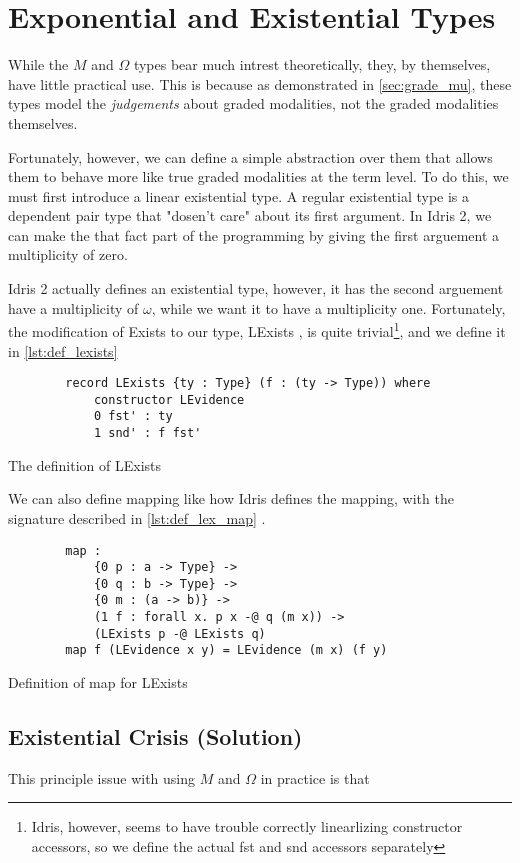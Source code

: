 \section{Exponential and Existential Types}

While the $M$ and $\Omega$ types bear much intrest theoretically, they, by themselves, have little practical use.
This is because as demonstrated in \ref{sec:grade_mu}, these types model the \emph{judgements} about graded modalities, not the graded modalities themselves.

Fortunately, however, we can define a simple abstraction over them that allows them to behave more like true graded modalities at the term level.
To do this, we must first introduce a linear existential type.
A regular existential type is a dependent pair type that "dosen't care" about its first argument. 
In Idris 2, we can make the that fact part of the programming by giving the first arguement a multiplicity of zero.

Idris 2 actually defines an existential type, however, it has the second arguement have a multiplicity of $\omega$, while we want it to have a multiplicity one.
Fortunately, the modification of \ident Exists to our type, \ident LExists , is quite trivial\footnote{Idris, however, seems to have trouble correctly linearlizing constructor accessors, so we define the actual \ident fst and \ident snd accessors separately}, and we define it in \ref{lst:def_lexists}

\begin{listing}
	\begin{verbatim}
		record LExists {ty : Type} (f : (ty -> Type)) where
			constructor LEvidence
			0 fst' : ty 
			1 snd' : f fst'
	\end{verbatim}
	\caption{The definition of \ident LExists }
	\label{lst:def_lexists}
\end{listing}

We can also define mapping like how Idris defines the mapping, with the signature described in \ref{lst:def_lex_map} \cite{idris_base}.

\begin{listing}
	\begin{verbatim}
		map : 
			{0 p : a -> Type} -> 
			{0 q : b -> Type} -> 
			{0 m : (a -> b)} -> 
			(1 f : forall x. p x -@ q (m x)) -> 
			(LExists p -@ LExists q)
		map f (LEvidence x y) = LEvidence (m x) (f y)
	\end{verbatim}
	\caption{Definition of \ident map for \ident LExists }
	\label{lst:def_lex_map}
\end{listing}
 
\subsection{Existential Crisis (Solution)}

This principle issue with using $M$ and $\Omega$ in practice is that
